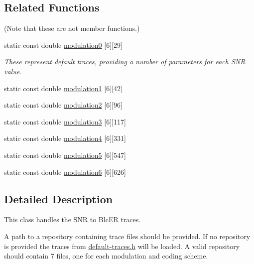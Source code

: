 \subsection*{Related Functions}
(Note that these are not member functions.) {\bf }\par
\begin{DoxyCompactItemize}
\item 
static const double \hyperlink{classns3_1_1SNRToBlockErrorRateManager_ab85f6c8f2604855998ed15c069e62513}{modulation0} \mbox{[}6\mbox{]}\mbox{[}29\mbox{]}
\begin{DoxyCompactList}\small\item\em These represent default traces, providing a number of parameters for each S\+NR value. \end{DoxyCompactList}\item 
static const double \hyperlink{classns3_1_1SNRToBlockErrorRateManager_a748cc86d24982cdcab55497c0813d249}{modulation1} \mbox{[}6\mbox{]}\mbox{[}42\mbox{]}
\item 
static const double \hyperlink{classns3_1_1SNRToBlockErrorRateManager_adcc1f71f0e96746552c6d3269dc1889a}{modulation2} \mbox{[}6\mbox{]}\mbox{[}96\mbox{]}
\item 
static const double \hyperlink{classns3_1_1SNRToBlockErrorRateManager_ac3cc26ad3beab93e7e4f75686442ed00}{modulation3} \mbox{[}6\mbox{]}\mbox{[}117\mbox{]}
\item 
static const double \hyperlink{classns3_1_1SNRToBlockErrorRateManager_af9859714760453902c7b79c22ffb2e23}{modulation4} \mbox{[}6\mbox{]}\mbox{[}331\mbox{]}
\item 
static const double \hyperlink{classns3_1_1SNRToBlockErrorRateManager_a372c6f277041e32ca86feef90760a676}{modulation5} \mbox{[}6\mbox{]}\mbox{[}547\mbox{]}
\item 
static const double \hyperlink{classns3_1_1SNRToBlockErrorRateManager_abd73becdc6070587be5ddd2ce88959f8}{modulation6} \mbox{[}6\mbox{]}\mbox{[}626\mbox{]}
\end{DoxyCompactItemize}



\subsection{Detailed Description}
This class handles the S\+NR to Blc\+ER traces. 

A path to a repository containing trace files should be provided. If no repository is provided the traces from \hyperlink{default-traces_8h}{default-\/traces.\+h} will be loaded. A valid repository should contain 7 files, one for each modulation and coding scheme.

